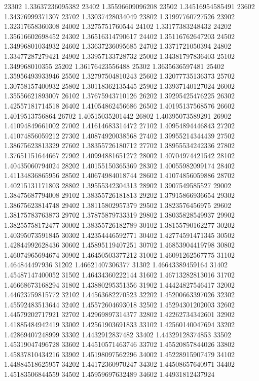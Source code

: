 {23302 1.33637236095382
23402 1.35596609096208
23502 1.34516954585491
23602 1.34376999371307
23702 1.33037428034049
23802 1.31997760727526
23902 1.32317658360308
24002 1.3275751760544
24102 1.33177383248432
24202 1.35616602698452
24302 1.36516314790617
24402 1.35116762647203
24502 1.34996801034932
24602 1.33637236095685
24702 1.3371721050394
24802 1.33477287279421
24902 1.33957133728732
25002 1.34381797836403
25102 1.349968010355
25202 1.36176423556488
25302 1.3635636597481
25402 1.35956493933946
25502 1.32797504810243
25602 1.32077735136373
25702 1.30758157400932
25802 1.30118362135445
25902 1.33937140127024
26002 1.35556621893007
26102 1.37675943710126
26202 1.39295425476225
26302 1.42557181714518
26402 1.41054862456686
26502 1.40195137568576
26602 1.4019513756864
26702 1.40515035201442
26802 1.40395073589291
26902 1.41094849661002
27002 1.41614683314472
27102 1.40954894446843
27202 1.41074856059212
27302 1.40874920038568
27402 1.39955214344439
27502 1.38675623813329
27602 1.38355726180712
27702 1.38955534242336
27802 1.37651151644667
27902 1.40994881651272
28002 1.40704974421542
28102 1.40435060794024
28202 1.40155150365369
28302 1.40055982099174
28402 1.41134836865956
28502 1.40674984018744
28602 1.41074856059886
28702 1.40215131171803
28802 1.39555342304313
28902 1.3907549585527
29002 1.38475687794008
29102 1.38355726181813
29202 1.37915866936654
29302 1.38675623814748
29402 1.38115802957379
29502 1.3823576456975
29602 1.38175783763873
29702 1.37875879733319
29802 1.38035828549937
29902 1.38255758172477
30002 1.38355726182789
30102 1.38155790162277
30202 1.40395073591845
30302 1.42354446592771
30402 1.42774591471345
30502 1.42844992628436
30602 1.45895119407251
30702 1.46853904419798
30802 1.46074965694674
30902 1.46450503377212
31002 1.46091262567775
31102 1.464844497936
31202 1.46621407306377
31302 1.46643389459164
31402 1.45487147400052
31502 1.46434360222144
31602 1.46713282813016
31702 1.46668673168294
31802 1.43880295351356
31902 1.44424827546417
32002 1.44623759815772
32102 1.44563682270523
32202 1.45200663397026
32302 1.45592483513644
32402 1.45572604693018
32502 1.45294301202003
32602 1.44579202717921
32702 1.42969897314377
32802 1.42262734342601
32902 1.41885484942419
33002 1.42561903691833
33102 1.42560140047694
33202 1.42869407248999
33302 1.4432912837482
33402 1.44329128374853
33502 1.45319047496728
33602 1.44510571463746
33702 1.45520857844026
33802 1.45837810434216
33902 1.45198097562296
34002 1.45228915907479
34102 1.44884518625957
34202 1.44172360970247
34302 1.44508657640971
34402 1.45183506844559
34502 1.45959697632489
34602 1.44931812437924
}
